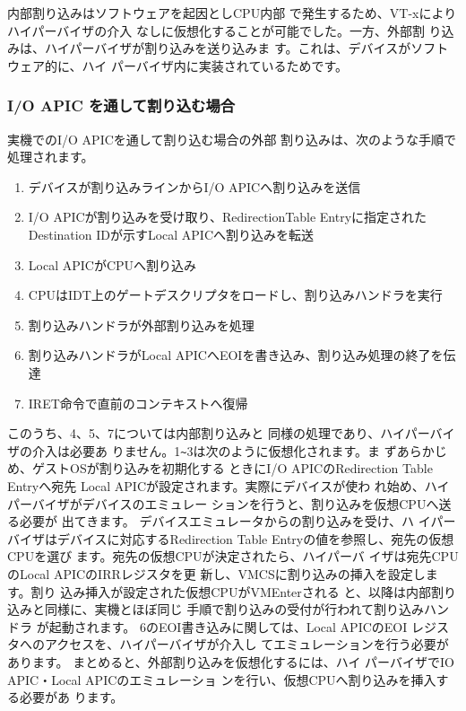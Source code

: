  内部割り込みはソフトウェアを起因としCPU内部
で発生するため、VT-xによりハイパーバイザの介入
なしに仮想化することが可能でした。一方、外部割
り込みは、ハイパーバイザが割り込みを送り込みま
す。これは、デバイスがソフトウェア的に、ハイ
パーバイザ内に実装されているためです。

\subsubsection*{I/O APIC を通して割り込む場合}
 実機でのI/O APICを通して割り込む場合の外部
割り込みは、次のような手順で処理されます。

\begin{enumerate}

\item デバイスが割り込みラインからI/O APICへ割り込みを送信
\item I/O APICが割り込みを受け取り、RedirectionTable Entryに指定されたDestination IDが示すLocal APICへ割り込みを転送
\item Local APICがCPUへ割り込み
\item CPUはIDT上のゲートデスクリプタをロードし、割り込みハンドラを実行
\item 割り込みハンドラが外部割り込みを処理
\item 割り込みハンドラがLocal APICへEOIを書き込み、割り込み処理の終了を伝達
\item IRET命令で直前のコンテキストへ復帰
\end{enumerate}


 このうち、4、5、7については内部割り込みと
同様の処理であり、ハイパーバイザの介入は必要あ
りません。1\verb|~|3は次のように仮想化されます。ま
ずあらかじめ、ゲストOSが割り込みを初期化する
ときにI/O APICのRedirection Table Entryへ宛先
Local APICが設定されます。実際にデバイスが使わ
れ始め、ハイパーバイザがデバイスのエミュレー
ションを行うと、割り込みを仮想CPUへ送る必要が
出てきます。
 デバイスエミュレータからの割り込みを受け、ハ
イパーバイザはデバイスに対応するRedirection
Table Entryの値を参照し、宛先の仮想CPUを選び
ます。宛先の仮想CPUが決定されたら、ハイパーバ
イザは宛先CPUのLocal APICのIRRレジスタを更
新し、VMCSに割り込みの挿入を設定します。割り
込み挿入が設定された仮想CPUがVMEnterされる
と、以降は内部割り込みと同様に、実機とほぼ同じ
手順で割り込みの受付が行われて割り込みハンドラ
が起動されます。
 6のEOI書き込みに関しては、Local APICのEOI
レジスタへのアクセスを、ハイパーバイザが介入し
てエミュレーションを行う必要があります。
 まとめると、外部割り込みを仮想化するには、ハイ
パーバイザでIO APIC・Local APICのエミュレーショ
ンを行い、仮想CPUへ割り込みを挿入する必要があ
ります。

